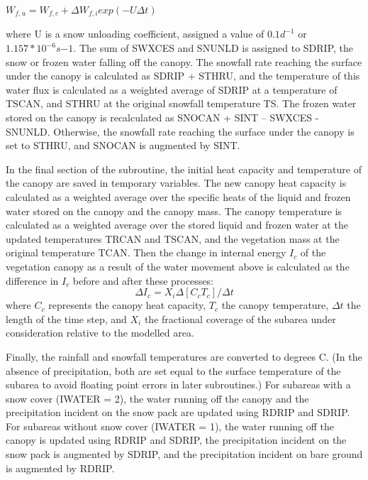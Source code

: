 $W_{f,u} = {W_{f,c} + \Delta W_{f,i} } exp (-U \Delta t)$

where U is a snow unloading coefficient, assigned a value of $0.1 d^{-1}$ or $1.157 * 10^{-6} s{-1}$. The sum of S\+W\+X\+C\+E\+S and S\+N\+U\+N\+L\+D is assigned to S\+D\+R\+I\+P, the snow or frozen water falling off the canopy. The snowfall rate reaching the surface under the canopy is calculated as S\+D\+R\+I\+P + S\+T\+H\+R\+U, and the temperature of this water flux is calculated as a weighted average of S\+D\+R\+I\+P at a temperature of T\+S\+C\+A\+N, and S\+T\+H\+R\+U at the original snowfall temperature T\+S. The frozen water stored on the canopy is recalculated as S\+N\+O\+C\+A\+N + S\+I\+N\+T – S\+W\+X\+C\+E\+S -\/ S\+N\+U\+N\+L\+D. Otherwise, the snowfall rate reaching the surface under the canopy is set to S\+T\+H\+R\+U, and S\+N\+O\+C\+A\+N is augmented by S\+I\+N\+T.

In the final section of the subroutine, the initial heat capacity and temperature of the canopy are saved in temporary variables. The new canopy heat capacity is calculated as a weighted average over the specific heats of the liquid and frozen water stored on the canopy and the canopy mass. The canopy temperature is calculated as a weighted average over the stored liquid and frozen water at the updated temperatures T\+R\+C\+A\+N and T\+S\+C\+A\+N, and the vegetation mass at the original temperature T\+C\+A\+N. Then the change in internal energy $I_c$ of the vegetation canopy as a result of the water movement above is calculated as the difference in $I_c$ before and after these processes\+: \[ \Delta I_c = X_i \Delta [C_c T_c ] / \Delta t \] where $C_c$ represents the canopy heat capacity, $T_c$ the canopy temperature, $\Delta t$ the length of the time step, and $X_i$ the fractional coverage of the subarea under consideration relative to the modelled area.

Finally, the rainfall and snowfall temperatures are converted to degrees C. (In the absence of precipitation, both are set equal to the surface temperature of the subarea to avoid floating point errors in later subroutines.) For subareas with a snow cover (I\+W\+A\+T\+E\+R = 2), the water running off the canopy and the precipitation incident on the snow pack are updated using R\+D\+R\+I\+P and S\+D\+R\+I\+P. For subareas without snow cover (I\+W\+A\+T\+E\+R = 1), the water running off the canopy is updated using R\+D\+R\+I\+P and S\+D\+R\+I\+P, the precipitation incident on the snow pack is augmented by S\+D\+R\+I\+P, and the precipitation incident on bare ground is augmented by R\+D\+R\+I\+P.